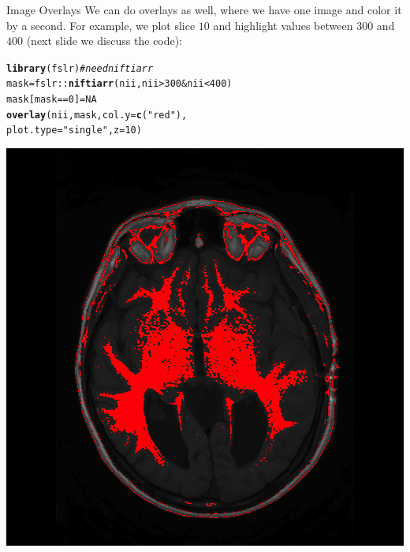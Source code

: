\documentclass[11pt]{beamer}\usepackage[]{graphicx}\usepackage[]{color}
\makeatletter
\newcommand{\hlnum}[1]{\textcolor[rgb]{0.686,0.059,0.569}{#1}}%
\newcommand{\hlstr}[1]{\textcolor[rgb]{0.192,0.494,0.8}{#1}}%
\newcommand{\hlcom}[1]{\textcolor[rgb]{0.678,0.584,0.686}{\textit{#1}}}%
\newcommand{\hlopt}[1]{\textcolor[rgb]{0,0,0}{#1}}%
\newcommand{\hlstd}[1]{\textcolor[rgb]{0.345,0.345,0.345}{#1}}%
\newcommand{\hlkwb}[1]{\textcolor[rgb]{0.69,0.353,0.396}{#1}}%
\newcommand{\hlkwc}[1]{\textcolor[rgb]{0.333,0.667,0.333}{#1}}%
\newcommand{\hlkwd}[1]{\textcolor[rgb]{0.737,0.353,0.396}{\textbf{#1}}}%
\newenvironment{kframe}{%
 \def\at@end@of@kframe{}%
 \ifinner\ifhmode%
  \def\at@end@of@kframe{\end{minipage}}%
  \begin{minipage}{\columnwidth}%
 \fi\fi%
 \def\FrameCommand##1{\hskip\@totalleftmargin \hskip-\fboxsep
 \colorbox{shadecolor}{##1}\hskip-\fboxsep
     \hskip-\linewidth \hskip-\@totalleftmargin \hskip\columnwidth}%
 \MakeFramed {\advance\hsize-\width
   \@totalleftmargin\z@ \linewidth\hsize
   \@setminipage}}%
 {\par\unskip\endMakeFramed%
 \at@end@of@kframe}
\newenvironment{knitrout}{}{} %
\makeatother
\begin{document}
\begin{frame}[fragile]{Image Overlays}
We can do overlays as well, where we have one image and color it by a second.  For example, we plot slice $10$ and highlight values between $300$ and $400$ (next slide we discuss the code):

\begin{center}
\begin{knitrout}
\color{fgcolor}\begin{kframe}
\begin{alltt}
\hlkwd{library}\hlstd{(fslr)} \hlcom{# need niftiarr}
\hlstd{mask} \hlkwb{=} \hlstd{fslr}\hlopt{::}\hlkwd{niftiarr}\hlstd{(nii, nii} \hlopt{>} \hlnum{300} \hlopt{&} \hlstd{nii} \hlopt{<} \hlnum{400}\hlstd{)}
\hlstd{mask[mask} \hlopt{==} \hlnum{0}\hlstd{]} \hlkwb{=} \hlnum{NA}
\hlkwd{overlay}\hlstd{(nii, mask,} \hlkwc{col.y}\hlstd{=} \hlkwd{c}\hlstd{(}\hlstr{"red"}\hlstd{),}
        \hlkwc{plot.type}\hlstd{=}\hlstr{"single"}\hlstd{,} \hlkwc{z} \hlstd{=} \hlnum{10}\hlstd{)}
\end{alltt}
\end{kframe}
\includegraphics[width=\textwidth,height=0.5\textheight,keepaspectratio]{figure/image_overlay-1} 

\end{knitrout}
\end{center}

\end{frame}
\end{document}
